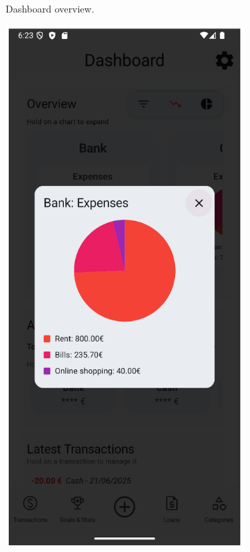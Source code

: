 \documentclass[a4paper,12pt]{article}
\begin{document}
\begin{figure}[H]
\begin{subfigure}[b]{0.23\textwidth}
        \caption{Dashboard overview.}
        \label{fig:dashboard_overview}
    \end{subfigure}
    \hfill
    \begin{subfigure}[b]{0.23\textwidth}
        \includegraphics[width=\textwidth]{chart_dialog_pie.png}

\end{subfigure}
\end{figure}
\end{document}

